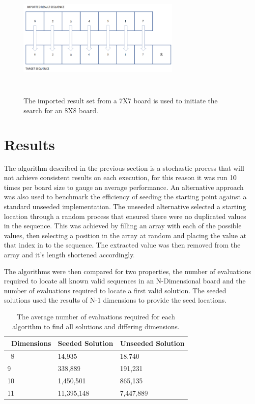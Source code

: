 \documentclass[conference]{IEEEtran}
\begin{document}
\begin{figure}[!htbp]
	\centering	
	\includegraphics[width=8cm, height=6cm]{ImportSequence}
	\caption{The imported result set from a 7X7 board is used to initiate the search for an 8X8 board.}
\end{figure}

\section{Results}
The algorithm described in the previous section is a stochastic process that will not achieve consistent results on each execution, for this reason it was run 10 times per board size to gauge an average performance. An alternative approach was also used to benchmark the efficiency of seeding the starting point against a standard unseeded implementation. The unseeded alternative selected a starting location through a random process that ensured there were no duplicated values in the sequence. This was achieved by filling an array with each of the possible values, then selecting a position in the array at random and placing the value at that index in to the sequence. The extracted value was then removed from the array and it's length shortened accordingly.

The algorithms were then compared for two properties, the number of evaluations required to locate all known valid sequences in an N-Dimensional board and the number of evaluations required to locate a first valid solution. The seeded solutions used the results of N-1 dimensions to provide the seed locations.

\begin{table}[ht]
	\begin{tabular}{|p{2cm}|p{6cm}|p{6cm}|} 
		\hline\
		Dimensions & Seeded Solution & Unseeded Solution \\
		\hline\
		8 & 14,935 & 18,740 \\
		9 & 338,889 & 191,231 \\
		10 & 1,450,501 & 865,135 \\
		11 & 11,395,148 & 7,447,889 \\
		\hline
	\end{tabular}
\caption{The average number of evaluations required for each algorithm to find all solutions and differing dimensions.}
\end{table}
\end{document}
